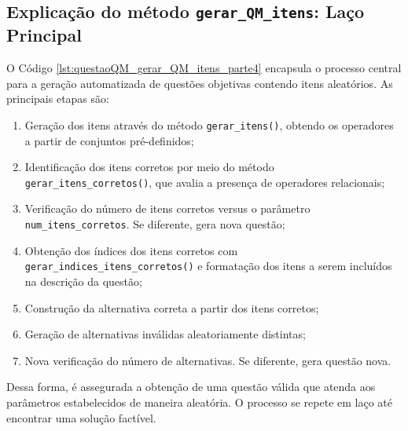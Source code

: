 \subsection{Explicação do método \texttt{gerar\_QM\_itens}: Laço Principal}

O Código \ref{lst:questaoQM_gerar_QM_itens_parte4} encapsula o processo central para a geração automatizada de questões objetivas contendo itens aleatórios. As principais etapas são:

\begin{enumerate}
    \item Geração dos itens através do método \verb|gerar_itens()|, obtendo os operadores a partir de conjuntos pré-definidos;
    \item Identificação dos itens corretos por meio do método \verb|gerar_itens_corretos()|, que avalia a presença de operadores relacionais;
    \item Verificação do número de itens corretos versus o parâmetro \verb|num_itens_corretos|. Se diferente, gera nova questão;
    \item Obtenção dos índices dos itens corretos com \verb|gerar_indices_itens_corretos()| e formatação dos itens a serem incluídos na descrição da questão;
    \item Construção da alternativa correta a partir dos itens corretos;
    \item Geração de alternativas inválidas aleatoriamente distintas;
    \item Nova verificação do número de alternativas. Se diferente, gera questão nova.
\end{enumerate}

Dessa forma, é assegurada a obtenção de uma questão válida que atenda aos parâmetros estabelecidos de maneira aleatória. O processo se repete em laço até encontrar uma solução factível.

